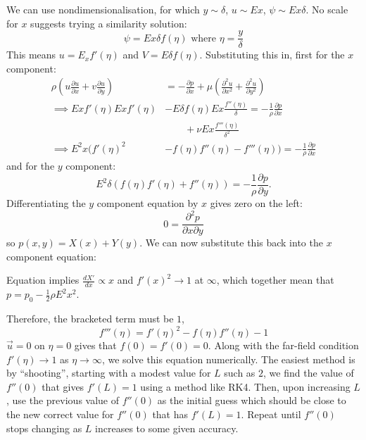 \documentclass[../Main.tex]{subfiles}
\begin{document}
\begin{example}
    We can use nondimensionalisation, for which $y \sim \delta$, $u \sim Ex$, $\psi \sim Ex \delta$. No scale for $x$ suggests trying a similarity solution:
    \begin{equation*}
        \psi = Ex \delta f(\eta) \text{ where } \eta = \frac{y}{\delta}
    \end{equation*}
    This means $u = E_x f'(\eta)$ and $V = E \delta f(\eta)$. Substituting this in, first for the $x$ component:
    \begin{align*}
        \rho \left(u \frac{\partial u}{\partial x} + v \frac{\partial u}{\partial y}\right) &= - \frac{\partial p}{\partial x} + \mu \left(\frac{\partial^{2}u}{\partial x^{2}} + \frac{\partial^{2}u}{\partial y^{2}}\right) \\
        \implies Ex f'(\eta) Ex f'(\eta) &- E \delta f(\eta) E x \frac{f''(\eta)}{\delta} = -\frac1\rho \frac{\partial p}{\partial x}\\
        &\qquad + \nu E x \frac{f'''(\eta)}{\delta^2} \\
        \implies E^2 x(f'(\eta)^2 &- f(\eta) f''(\eta) - f'''(\eta)) = -\frac1\rho \frac{\partial p}{\partial x}
    \end{align*}
    and for the $y$ component:
    \begin{equation*}
        E^2\delta(f(\eta) f'(\eta) + f''(\eta)) = -\frac1\rho \frac{\partial p}{\partial y}.
    \end{equation*}
    Differentiating the $y$ component equation by $x$ gives zero on the left:
    \begin{equation*}
        0 = \frac{\partial^{2}p}{\partial x\partial y}
    \end{equation*}
    so $p(x, y) = X(x) + Y(y)$. We can now substitute this back into the $x$ component equation:
    
    Equation %
    implies $\frac{dX'}{dx} \propto x$ and $f'(x)^2 \to 1$ at $\infty$, which together mean that $p = p_0 - \frac12 \rho E^2 x^2$.

    Therefore, the bracketed term must be $1$,
    \begin{equation*}
        f'''(\eta) = f'(\eta)^2 - f(\eta) f''(\eta) - 1
    \end{equation*}
    $\vec u = 0$ on $\eta = 0$ gives that $f(0) = f'(0) = 0$. Along with the far-field condition $f'(\eta) \to 1$ as $\eta \to \infty$, we solve this equation numerically. The easiest method is by ``shooting'', starting with a modest value for $L$ such as $2$, we find the value of $f''(0)$ that gives $f'(L) = 1$ using a method like RK4. Then, upon increasing $L$, use the previous value of $f''(0)$ as the initial guess which should be close to the new correct value for $f''(0)$ that has $f'(L) = 1$. Repeat until $f''(0)$ stops changing as $L$ increases to some given accuracy.


\end{example}
\end{document}

